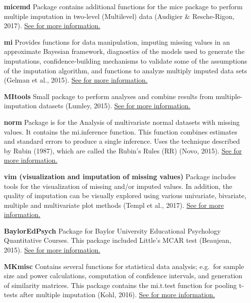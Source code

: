 \documentclass[]{book}
\begin{document}
\textbf{micemd} Package contains additional functions for the mice
package to perform multiple imputation in two-level (Multilevel) data
(Audigier \& Resche-Rigon, 2017).
\href{https://cran.r-project.org/web/packages/micemd/index.html}{See for
more information.}

\textbf{mi} Provides functions for data manipulation, imputing missing
values in an approximate Bayesian framework, diagnostics of the models
used to generate the imputations, confidence-building mechanisms to
validate some of the assumptions of the imputation algorithm, and
functions to analyze multiply imputed data sets (Gelman et al., 2015).
\href{https://cran.r-project.org/web/packages/mi/index.html}{See for
more information.}

\textbf{MItools} Small package to perform analyses and combine results
from multiple-imputation datasets (Lumley, 2015).
\href{https://cran.r-project.org/web/packages/mitools/index.html}{See
for more information.}

\textbf{norm} Package is for the Analysis of multivariate normal
datasets with missing values. It contains the mi.inference function.
This function combines estimates and standard errors to produce a single
inference. Uses the technique described by Rubin (1987), which are
called the Rubin's Rules (RR) (Novo, 2015).
\href{https://cran.r-project.org/web/packages/norm/index.html}{See for
more information.}

\textbf{vim (visualization and imputation of missing values)} Package
includes tools for the visualization of missing and/or imputed values.
In addition, the quality of imputation can be visually explored using
various univariate, bivariate, multiple and multivariate plot methods
(Templ et al., 2017).
\href{https://cran.r-project.org/web/packages/mi/index.html}{See for
more information.}

\textbf{BaylorEdPsych} Package for Baylor University Educational
Psychology Quantitative Courses. This package included Little's MCAR
test (Beaujean, 2015).
\href{https://cran.r-project.org/web/packages/BaylorEdPsych/index.html}{See
for more information.}

\textbf{MKmisc} Contains several functions for statistical data
analysis; e.g.~for sample size and power calculations, computation of
confidence intervals, and generation of similarity matrices. This
package contains the mi.t.test function for pooling t-tests after
multiple imputation (Kohl, 2016).
\href{https://cran.r-project.org/web/packages/MKmisc/index.html}{See for
more information.}
\end{document}
